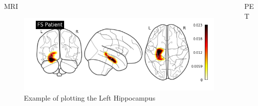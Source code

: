 \documentclass[final]{beamer}
\newlength{\onecolwid}
\newlength{\twocolwid}
\begin{document}
\begin{frame}[t]
\begin{columns}[t]
\begin{column}{\twocolwid}
\begin{columns}[t,totalwidth=\twocolwid]
\begin{column}{\onecolwid}
\begin{block}{MRI}
            \begin{figure}
                \includegraphics[width=1.0\linewidth]{images/hippo.png}
                \caption{Example of plotting the Left Hippocampus}
            \end{figure}
            \end{block}
            
        
        \end{column} %
        
        \begin{column}{\onecolwid} %
        
            
            \begin{block}{PET}
            
                

\end{block}
\end{column}
\end{columns}
\end{column}
\end{columns}
\end{frame}
\end{document}
